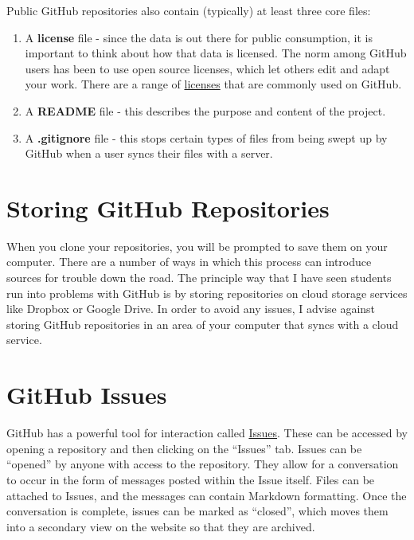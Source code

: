 \documentclass[]{book}
\begin{document}
Public GitHub repositories also contain (typically) at least three core
files:

\begin{enumerate}
\def\labelenumi{\arabic{enumi}.}
\item
  A \textbf{license} file - since the data is out there for public
  consumption, it is important to think about how that data is licensed.
  The norm among GitHub users has been to use open source licenses,
  which let others edit and adapt your work. There are a range of
  \href{http://choosealicense.com}{licenses} that are commonly used on
  GitHub.
\item
  A \textbf{README} file - this describes the purpose and content of the
  project.
\item
  A \textbf{.gitignore} file - this stops certain types of files from
  being swept up by GitHub when a user syncs their files with a server.
\end{enumerate}

\section{Storing GitHub Repositories}\label{storing-github-repositories}

When you clone your repositories, you will be prompted to save them on
your computer. There are a number of ways in which this process can
introduce sources for trouble down the road. The principle way that I
have seen students run into problems with GitHub is by storing
repositories on cloud storage services like Dropbox or Google Drive. In
order to avoid any issues, I advise against storing GitHub repositories
in an area of your computer that syncs with a cloud service.

\section{GitHub Issues}\label{github-issues}

GitHub has a powerful tool for interaction called
\href{https://help.github.com/articles/about-issues/}{Issues}. These can
be accessed by opening a repository and then clicking on the ``Issues''
tab. Issues can be ``opened'' by anyone with access to the repository.
They allow for a conversation to occur in the form of messages posted
within the Issue itself. Files can be attached to Issues, and the
messages can contain Markdown formatting. Once the conversation is
complete, issues can be marked as ``closed'', which moves them into a
secondary view on the website so that they are archived.
\end{document}
